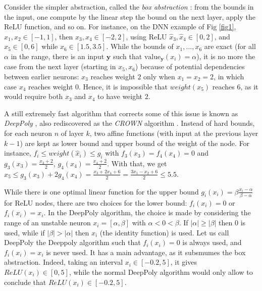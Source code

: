 \documentclass{llncs}
\newcommand{\vy}{\boldsymbol{y}}
\newcommand{\val}{{\textrm{value}}}
\begin{document}
Consider the simpler abstraction, called the {\em box abstraction} \cite{deeppoly}: from the bounds in the input, one compute by the linear step the bound on the next layer, apply the ReLU function, and so on. For instance, on the DNN example of Fig \ref{fig1}, $x_1,x_2 \in [-1,1]$, then $x_3,x_4 \in [-2,2]$, using ReLU $\hat{x}_3,\hat{x}_4 \in [0,2]$, and $x_5 \in [0,6]$ while $x_6 \in [1.5,3.5]$. 
While the bounds of $x_1, \ldots, x_6$ are exact (for all $\alpha$ 
in the range, there is an input $\vy$ such that $\val_{\vy}(x_i)=\alpha$), 
it is no more the case from the next layer (starting in $x_5,x_6$) because of potential 
dependencies between earlier neurons: $x_3$ reaches weight $2$ only when $x_1=x_2=2$,
in which case $x_4$ reaches weight $0$. Hence, it is impossible that $weight(x_5)$ reaches $6$, as it would require both $x_3$ and $x_4$ to have weight $2$.

A still extremely fast algorithm that corrects some of this issue is known as {\em DeepPoly} \cite{deeppoly}, also rediscovered as the {\em CROWN} algorithm \cite{crown}. Instead of 
hard bounds, for each neuron $n$ of layer $k$, two affine functions (with input at the previous layer $k-1$) are kept as lower bound and upper bound of the weight of the node.
For instance, $f_i \leq weight(\hat{x}_i) \leq g_i$ with 
$f_{3}(x_3)=f_4(x_4)=0$ and 
$g_3(x_3) = \frac{x_3+2}{2}$,
$g_4(x_4) = \frac{x_4+2}{2}$. 
With that, we get 
$x_5 \leq g_3(x_3) + 2 g_4(x_4) = \frac{x_3 + 2x_4 + 6}{2} = \frac{3x_1 - x_2 + 6}{2}\leq 5.5$.

While there is one optimal linear function for the upper bound $g_i(x_i)= \beta \frac{x_i-\alpha}{\beta-\alpha}$ for ReLU nodes, there are two choices for the lower bound: $f_i(x_i) = 0$ or $f_i(x_i)=x_i$.
In the DeepPoly algorithm, the choice is made by considering the range of an unstable neuron 
$x_i=[\alpha,\beta]$ with $\alpha < 0 < \beta$. 
If $|\alpha|\geq |\beta|$ then $0$ is used, while if $|\beta|>|\alpha|$ then $x_i$ (the identity function) is used. Let us call $\overline{\mbox{DeepPoly}}$ the Deeppoly algorithm such that 
$f_i(x_i) = 0$ is always used, and $f_i(x_i) = x_i$ is never used. 
It has a main advantage, as it subsmumes the box abstraction.
Indeed, taking an interval $x_i \in [-0.2,5]$, it gives $ReLU(x_i) \in [0,5]$, 
while the normal DeepPoly algorithm would only allow to conclude that $ReLU(x_i) \in [-0.2,5]$.

\end{document}
